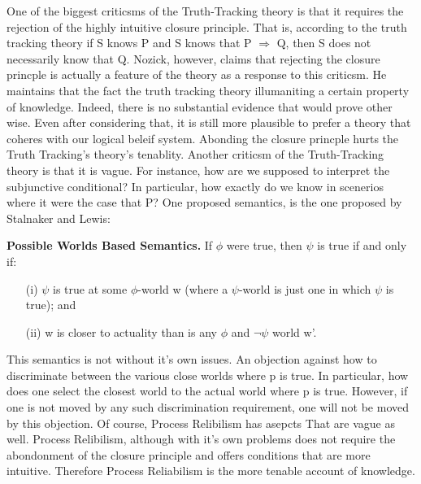 \documentclass{article}
\begin{document}

One of the biggest criticsms of the Truth-Tracking theory is that it requires
the rejection of the highly intuitive closure principle. That is, according
to the truth tracking theory if S knows P and S  knows that  P $\Rightarrow$ Q,
then S does not necessarily know that Q. Nozick, however, claims that rejecting
the closure princple is actually a feature of the theory as a response to this
criticsm. He maintains that the fact the truth tracking theory illumaniting a
certain property of knowledge. Indeed, there is no substantial evidence that would
prove other wise. Even after considering that, it is still more plausible
to prefer a theory that coheres with our logical beleif system. Abonding the
closure princple hurts the Truth Tracking's theory's tenablity. Another criticsm
of the Truth-Tracking theory is that it is vague. For instance, how are we
supposed to interpret the subjunctive conditional? In particular, how exactly
do we know in scenerios where it were the case that P? One proposed semantics, is
the one proposed by Stalnaker and Lewis:
\begin{displayquote}
  \textbf{Possible Worlds Based Semantics.}
  If $\phi$ were true, then $\psi$ is true if and only if:
  \begin{enumerate}
    \item[(i)] $\psi$ is true at some $\phi$-world w
    (where a $\psi$-world is just one in which $\psi$ is true); and
    \item[(ii)] w is closer to actuality than is any $\phi$ and $\neg \psi$
    world w'.
  \end{enumerate}
\end{displayquote}

This semantics is not without it's own issues. An objection against how
to discriminate between the various close worlds where p is true. In particular,
how does one select the closest world to the actual world where p is true.
However, if one is not moved by any such discrimination requirement,
one will not be moved by this objection. Of course, Process Relibilism has asepcts
That are vague as well. Process Relibilism, although with it's own
problems does not require the abondonment of the closure principle and offers
conditions that are more intuitive. Therefore Process Reliabilism is the more
tenable account of knowledge.

\end{document}
